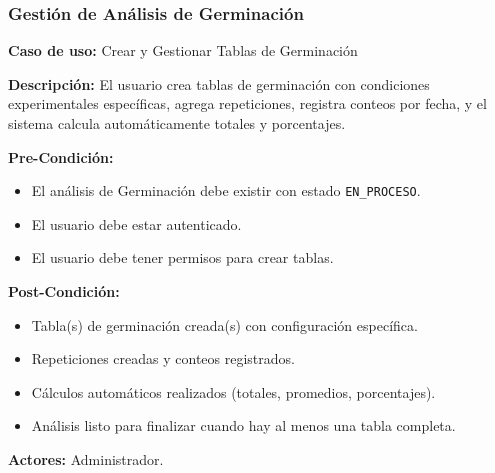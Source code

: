 \subsubsection{Gestión de Análisis de Germinación}

\noindent\textbf{Caso de uso:} Crear y Gestionar Tablas de Germinación

\vspace{0.5em}
\noindent\textbf{Descripción:} El usuario crea tablas de germinación con condiciones experimentales específicas, agrega repeticiones, registra conteos por fecha, y el sistema calcula automáticamente totales y porcentajes.

\vspace{0.5em}
\noindent\textbf{Pre-Condición:}
\begin{itemize}[nosep]
    \item El análisis de Germinación debe existir con estado \texttt{EN\_PROCESO}.
    \item El usuario debe estar autenticado.
    \item El usuario debe tener permisos para crear tablas.
\end{itemize}

\vspace{0.5em}
\noindent\textbf{Post-Condición:}
\begin{itemize}[nosep]
    \item Tabla(s) de germinación creada(s) con configuración específica.
    \item Repeticiones creadas y conteos registrados.
    \item Cálculos automáticos realizados (totales, promedios, porcentajes).
    \item Análisis listo para finalizar cuando hay al menos una tabla completa.
\end{itemize}

\vspace{0.5em}
\noindent\textbf{Actores:} Administrador.

